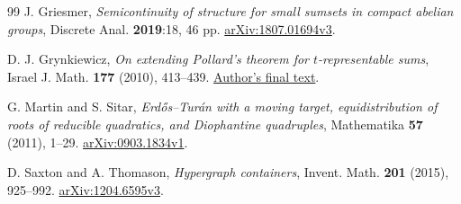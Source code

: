 \documentclass[11pt,reqno]{amsart}
\numberwithin{equation}{section}
\begin{document}
\begin{thebibliography}{99}
J. Griesmer, \emph{Semicontinuity of structure for small sumsets in
compact abelian groups}, Discrete Anal. \textbf{2019}:18, 46 pp.
\href{https://arxiv.org/abs/1807.01694v3}{arXiv:1807.01694v3}.

D. J. Grynkiewicz, \emph{On extending Pollard's theorem for
\(t\)-representable sums}, Israel J. Math. \textbf{177} (2010), 413--439.
\href{https://www.diambri.org/Mathpdfs/pollard--vFIN.pdf}{Author's final text}.

G. Martin and S. Sitar, \emph{Erd\H{o}s--Tur\'an with a moving target,
equidistribution of roots of reducible quadratics, and Diophantine
quadruples}, Mathematika \textbf{57} (2011), 1--29.
\href{https://arxiv.org/abs/0903.1834v1}{arXiv:0903.1834v1}.

D. Saxton and A. Thomason, \emph{Hypergraph containers},
Invent. Math. \textbf{201} (2015), 925--992.
\href{https://arxiv.org/abs/1204.6595v3}{arXiv:1204.6595v3}.

\end{thebibliography}
\end{document}
